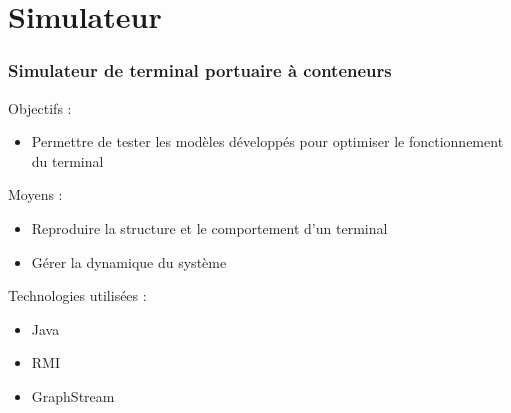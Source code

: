 \documentclass{beamer}
\begin{document}
\section{Simulateur}
\begin{frame}
\frametitle{Simulateur de terminal portuaire à conteneurs}
 \begin{block}{Objectifs : }
    \begin{itemize}
     \item Permettre de tester les modèles développés pour optimiser le fonctionnement du terminal
    \end{itemize}
 \end{block}
  \begin{block}{Moyens : }
   \begin{itemize}
     \item Reproduire la structure et le comportement d'un terminal
     \item Gérer la dynamique du système
   \end{itemize}
  \end{block}

  \begin{block}{Technologies utilisées : }
    \begin{itemize}
     \item Java
     \item RMI
     \item GraphStream\cite{graphstream}
    \end{itemize}
  \end{block}
\end{frame}

\tiny


\end{document}

